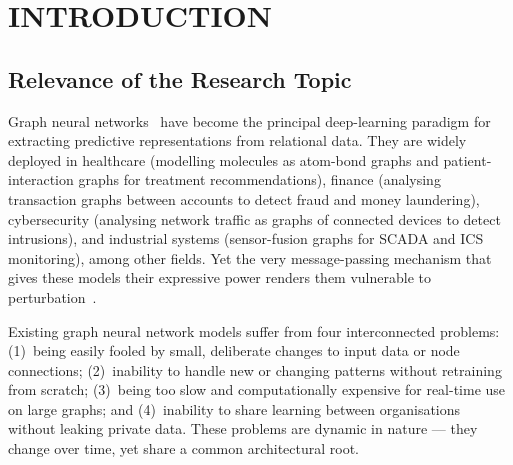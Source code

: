 
\chapter*{INTRODUCTION}

\section*{Relevance of the Research Topic}

Graph neural networks~\cite{Kipf2017,Velickovic2018,Hamilton2017} have become the principal deep-learning paradigm for extracting predictive representations from relational data. They are widely deployed in healthcare (modelling molecules as atom-bond graphs and patient-interaction graphs for treatment recommendations), finance (analysing transaction graphs between accounts to detect fraud and money laundering), cybersecurity (analysing network traffic as graphs of connected devices to detect intrusions), and industrial systems (sensor-fusion graphs for SCADA and ICS monitoring), among other fields. Yet the very message-passing mechanism that gives these models their expressive power renders them vulnerable to perturbation~\cite{Zuegner2018,Bojchevski2019,Dai2018}.

Existing graph neural network models suffer from four interconnected problems: (1)~being easily fooled by small, deliberate changes to input data or node connections; (2)~inability to handle new or changing patterns without retraining from scratch; (3)~being too slow and computationally expensive for real-time use on large graphs; and (4)~inability to share learning between organisations without leaking private data. These problems are dynamic in nature --- they change over time, yet share a common architectural root.

